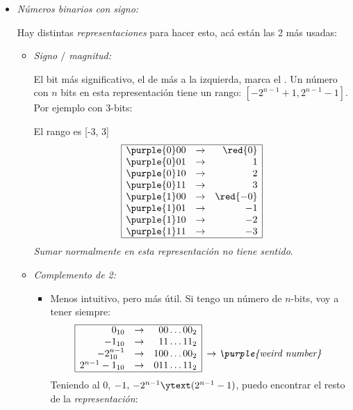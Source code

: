 \begin{itemize}[label=\iconTeoriaUno]
  \item \textit{Números binarios con signo: }\par
        Hay distintas \textit{representaciones} para hacer esto, acá están las 2 más usadas:
        \begin{itemize}[label=\iconTeoriaDos]
          \item \textit{Signo $\big/$ magnitud:}\par
                El bit más significativo, el de más a la izquierda, marca el .
                Un número con $n$ bits en esta representación tiene un rango: $[-2^{n-1}+1, 2^{n-1} - 1]$.
                Por ejemplo con 3-bits:\par
                El rango es [-3, 3]
                $$
                  \begin{array}{|ccr|}
                    \hline
                    \purple{0}00 & \to & \red{0}  \\
                    \purple{0}01 & \to & 1        \\
                    \purple{0}10 & \to & 2        \\
                    \purple{0}11 & \to & 3        \\
                    \purple{1}00 & \to & \red{-0} \\
                    \purple{1}01 & \to & -1       \\
                    \purple{1}10 & \to & -2       \\
                    \purple{1}11 & \to & -3       \\
                    \hline
                  \end{array}
                $$
                \textit{Sumar normalmente en esta representación no tiene sentido}.

          \item \textit{Complemento de 2:}\par
                \begin{itemize}[label=\iconTeoriaTres]
                  \item Menos intuitivo, pero más útil. Si tengo un número de $n$-bits, voy a tener siempre:
                        $$
                          \begin{array}{|rcr|l}
                            \cline{1-3}
                            0_{10}           & \to & 00\dots00_2  &                                    \\
                            -1_{10}          & \to & 11\dots11_2  &                                    \\
                            -2^{n-1}_{10}    & \to & 100\dots00_2 & \to \textit{\purple{weird number}} \\
                            2^{n-1} - 1_{10} & \to & 011\dots11_2 &                                    \\
                            \cline{1-3}
                          \end{array}
                        $$
                        Teniendo al 0, $-1, \,-2^{n-1} \ytext (2^{n-1} -1)$, puedo encontrar el resto de la \textit{representación}:


\end{itemize}
\end{itemize}
\end{itemize}
